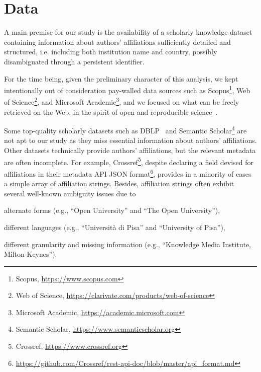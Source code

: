 \documentclass{llncs}
\begin{document}
\section{Data}
\label{sec:data}
A main premise for our study is the availability of a scholarly knowledge dataset containing information about authors' affiliations sufficiently detailed and structured, i.e. including both institution name and country, possibly disambiguated through a persistent identifier.

For the time being, given the preliminary character of this analysis, we kept intentionally out of consideration pay-walled data sources such as Scopus\footnote{Scopus, \url{https://www.scopus.com}}, Web of Science\footnote{Web of Science, \url{https://clarivate.com/products/web-of-science}}, and Microsoft Academic\footnote{Microsoft Academic, \url{https://academic.microsoft.com}}, and we focused on what can be freely retrieved on the Web, in the spirit of open and reproducible science~\cite{wilkinson2016fair}.

Some top-quality scholarly datasets such as DBLP~\cite{ley2009} and Semantic Scholar\footnote{Semantic Scholar, \url{https://www.semanticscholar.org}} are not apt to our study as they miss essential information about authors' affiliations.
Other datasets technically provide authors' affiliations, but the relevant metadata are often incomplete.
For example, Crossref\footnote{Crossref, \url{https://www.crossref.org}}, despite declaring a field devised for affiliations in their metadata API JSON format\footnote{ \url{https://github.com/Crossref/rest-api-doc/blob/master/api_format.md}}, provides in a minority of cases a simple array of affiliation strings.
Besides, affiliation strings often exhibit several well-known ambiguity issues due to
\begin{enumerate*}[label=(\roman*)]
\item alternate forms (e.g., ``Open University'' and ``The Open University''),
\item different languages (e.g., ``Universit\`{a} di Pisa'' and ``University of Pisa''),
\item different granularity and missing information (e.g., ``Knowledge Media Institute, Milton Keynes'').
\end{enumerate*}
\end{document}

